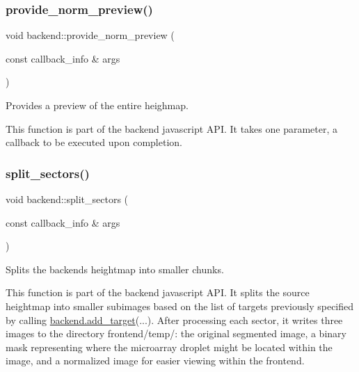 \subsubsection{\texorpdfstring{provide\+\_\+norm\+\_\+preview()}{provide\_norm\_preview()}}
{\footnotesize\ttfamily void backend\+::provide\+\_\+norm\+\_\+preview (\begin{DoxyParamCaption}\item[{const callback\+\_\+info \&}]{args }\end{DoxyParamCaption})\hspace{0.3cm}{\ttfamily [static]}}



Provides a preview of the entire heighmap. 

This function is part of the backend javascript A\+PI. It takes one parameter, a callback to be executed upon completion. \mbox{\label{classbackend_a3b212ebed9184a5818c9ce81b5513a3c}} 
\subsubsection{\texorpdfstring{split\+\_\+sectors()}{split\_sectors()}}
{\footnotesize\ttfamily void backend\+::split\+\_\+sectors (\begin{DoxyParamCaption}\item[{const callback\+\_\+info \&}]{args }\end{DoxyParamCaption})\hspace{0.3cm}{\ttfamily [static]}}



Splits the backend\textquotesingle{}s heightmap into smaller chunks. 

This function is part of the backend javascript A\+PI. It splits the source heightmap into smaller subimages based on the list of targets previously specified by calling \hyperlink{classbackend_ac981fabc3077c133dca35b5cb7e6f66c}{backend.\+add\+\_\+target}(...). After processing each sector, it writes three images to the directory frontend/temp/\+: the original segmented image, a binary mask representing where the microarray droplet might be located within the image, and a normalized image for easier viewing within the frontend. \mbox{\label{classbackend_a567b1f81aaa959b25ab5448752a5a371}} 
